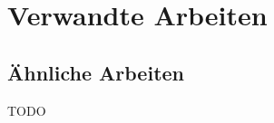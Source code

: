 \chapter{Verwandte Arbeiten}
\label{chap:intro}
\chapterstart
\section{Ähnliche Arbeiten}
TODO
\chapterend